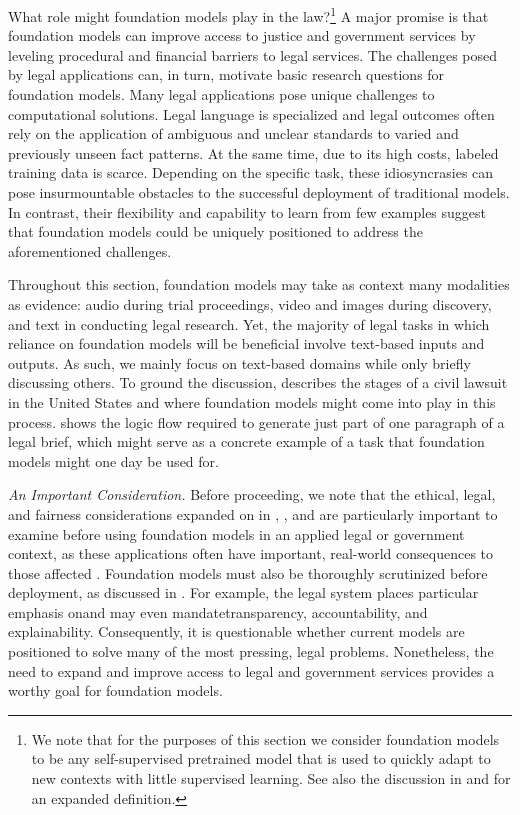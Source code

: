 What role might foundation models play in the law?\footnote{We note that for the purposes of this section we consider foundation models to be any self-supervised pretrained model that is used to quickly adapt to new contexts with little supervised learning. See also the discussion in  and  for an expanded definition.} A major promise is that foundation models can
improve access to justice and government services by leveling procedural and financial barriers to legal services. The challenges posed by legal applications can, in turn, motivate basic research questions for foundation models. Many legal applications pose unique challenges to computational solutions. Legal language is specialized and legal outcomes often rely on the application of ambiguous and unclear standards to varied and previously unseen fact patterns. At the same time, due to its high costs, labeled training data is scarce. Depending on the specific task, these idiosyncrasies can pose insurmountable obstacles to the successful deployment of traditional models. In contrast, their flexibility and capability to learn from few examples suggest that foundation models could be uniquely positioned to address the aforementioned challenges.

Throughout this section, foundation models may take as context many modalities as evidence: audio during trial proceedings, video and images during discovery, and text in conducting legal research. Yet, the majority of legal tasks in which reliance on foundation models will be beneficial involve text-based inputs and outputs. As such, we mainly focus on text-based domains while only briefly discussing others. 
To ground the discussion,  describes the stages of a civil lawsuit in the United States and where foundation models might come into play in this process.  shows the logic flow required to generate just part of one paragraph of a legal brief, which might serve as a concrete example of a task that foundation models might one day be used for.

\emph{An Important Consideration.} Before proceeding, we note that the ethical, legal, and fairness considerations expanded on in , , and  are particularly important to examine before using foundation models in an applied legal or government context, as these applications often have important, real-world consequences to those affected \citep{surden2020ethics}.
Foundation models must also be thoroughly scrutinized before deployment, as discussed in .
For example, the legal system places particular emphasis on\dash{}and may even mandate\dash{}transparency, accountability, and explainability.
Consequently, it is questionable whether current models are positioned to solve many of the most pressing, legal problems.
Nonetheless, the need to expand and improve access to legal and government services provides a worthy goal for foundation models.  

